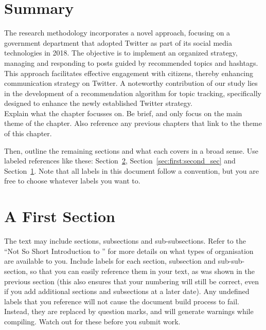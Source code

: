 \section{Summary}
\label{sec:first:summary}

The research methodology incorporates a novel approach, focusing on a government department that adopted Twitter as part of its social media technologies in 2018. The objective is to implement an organized strategy, managing and responding to posts guided by recommended topics and hashtags. This approach facilitates effective engagement with citizens, thereby enhancing communication strategy on Twitter. A noteworthy contribution of our study lies in the development of a recommendation algorithm for topic tracking, specifically designed to enhance the newly established Twitter strategy.\\




Explain what the chapter focusses on. Be brief, and only focus on the main theme of the chapter. Also reference any previous chapters that link to the theme of this chapter.

Then, outline the remaining sections and what each covers in a broad sense. Use labeled references like these: Section~\ref{sec:first:first_sec}, Section~\ref{sec:first:second_sec} and Section~\ref{sec:first:summary}. Note that all labels in this document follow a convention, but you are free to choose whatever labels you want to.


\section{A First Section}
\label{sec:first:first_sec}

The text may include sections, subsections and sub-subsections. Refer to the ``Not So Short Introduction to \LaTeXe'' for more details on what types of organisation are available to you. Include labels for each section, subsection and sub-sub-section, so that you can easily reference them in your text, as was shown in the previous section (this also ensures that your numbering will still be correct, even if you add additional sections and subsections at a later date). Any undefined labels that you reference will not cause the document build process to fail. Instead, they are replaced by question marks, and will generate warnings while compiling. Watch out for these before you submit work.


